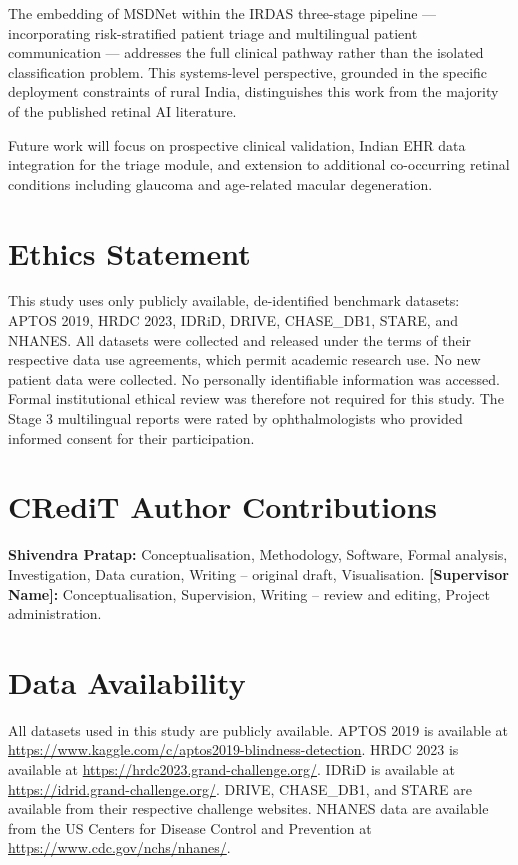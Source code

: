 \documentclass[review,12pt]{elsarticle}
\begin{document}
The embedding of MSDNet within the IRDAS three-stage pipeline — incorporating
risk-stratified patient triage and multilingual patient communication —
addresses the full clinical pathway rather than the isolated classification
problem. This systems-level perspective, grounded in the specific deployment
constraints of rural India, distinguishes this work from the majority of the
published retinal AI literature.

Future work will focus on prospective clinical validation, Indian EHR data
integration for the triage module, and extension to additional co-occurring
retinal conditions including glaucoma and age-related macular degeneration.

\section*{Ethics Statement}

This study uses only publicly available, de-identified benchmark datasets:
APTOS 2019, HRDC 2023, IDRiD, DRIVE, CHASE\_DB1, STARE, and NHANES. All
datasets were collected and released under the terms of their respective
data use agreements, which permit academic research use. No new patient data
were collected. No personally identifiable information was accessed. Formal
institutional ethical review was therefore not required for this study. The
Stage 3 multilingual reports were rated by ophthalmologists who provided
informed consent for their participation.

\section*{CRediT Author Contributions}

\textbf{Shivendra Pratap:} Conceptualisation, Methodology, Software,
Formal analysis, Investigation, Data curation, Writing -- original draft,
Visualisation.
\textbf{[Supervisor Name]:} Conceptualisation, Supervision, Writing --
review and editing, Project administration.

\section*{Data Availability}

All datasets used in this study are publicly available. APTOS 2019 is
available at \url{https://www.kaggle.com/c/aptos2019-blindness-detection}.
HRDC 2023 is available at \url{https://hrdc2023.grand-challenge.org/}.
IDRiD is available at \url{https://idrid.grand-challenge.org/}.
DRIVE, CHASE\_DB1, and STARE are available from their respective challenge
websites. NHANES data are available from the US Centers for Disease Control
and Prevention at \url{https://www.cdc.gov/nchs/nhanes/}.
\end{document}
